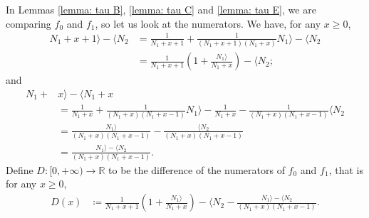 \documentclass{ws-ijnt}
\begin{document}
	In Lemmas \ref{lemma: tau B}, \ref{lemma: tau C} and \ref{lemma: tau E}, we are comparing $f_0$ and $f_1$, so let us look at the numerators.
	We have, for any $x\geq0$,
	\begin{align*}
		N_1+x+1\rangle-\langle N_2
		&=\frac{1}{N_1+x+1}+\frac{1}{(N_1+x+1)(N_1+x)}N_1\rangle-\langle N_2 \\
		&=\frac{1}{N_1+x+1}\left(1+\frac{N_1\rangle}{N_1+x}\right)-\langle N_2
		;
	\end{align*}
	and
	\begin{align*}
		N_1+&x\rangle -\langle N_1+x \\
		&=\frac{1}{N_1+x}+\frac{1}{(N_1+x)(N_1+x-1)}N_1\rangle-\frac{1}{N_1+x}-\frac{1}{(N_1+x)(N_1+x-1)}\langle N_2 \\
		&=\frac{N_1\rangle}{(N_1+x)(N_1+x-1)}-\frac{\langle N_2}{(N_1+x)(N_1+x-1)}\\
		&=\frac{N_1\rangle-\langle N_2}{(N_1+x)(N_1+x-1)}.
	\end{align*}
	Define $D:[0,+\infty)\to\mathbb{R}$ to be the difference of the numerators of $f_0$ and $f_1$, that is for any $x\geq0$,
	\begin{align}
		\label{eq: def D}
		D(x)
		&\coloneqq \frac{1}{N_1+x+1}\left(1+\frac{N_1\rangle}{N_1+x}\right)-\langle N_2-\frac{N_1\rangle-\langle N_2}{(N_1+x)(N_1+x-1)}.
	\end{align}
\end{document}
